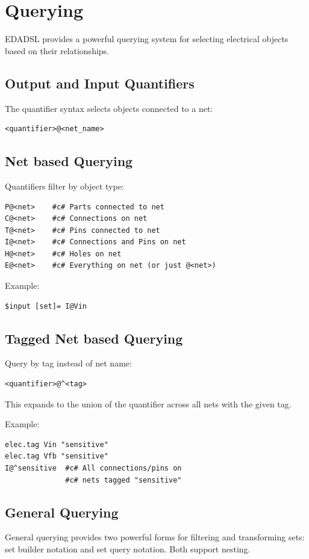 \documentclass{report}
\begin{document}
\chapter{Querying}
EDADSL provides a powerful querying system for selecting electrical objects based on their relationships.

\section{Output and Input Quantifiers}
The quantifier syntax selects objects connected to a net:
\begin{verbatim}
<quantifier>@<net_name>
\end{verbatim}

\section{Net based Querying}
Quantifiers filter by object type:
\begin{verbatim}
P@<net>    #c# Parts connected to net
C@<net>    #c# Connections on net
T@<net>    #c# Pins connected to net
I@<net>    #c# Connections and Pins on net
H@<net>    #c# Holes on net
E@<net>    #c# Everything on net (or just @<net>)
\end{verbatim}

Example:
\begin{verbatim}
$input [set]= I@Vin
\end{verbatim}

\section{Tagged Net based Querying}
Query by tag instead of net name:
\begin{verbatim}
<quantifier>@^<tag>
\end{verbatim}
This expands to the union of the quantifier across all nets with the given tag.

Example:
\begin{verbatim}
elec.tag Vin "sensitive"
elec.tag Vfb "sensitive"
I@^sensitive  #c# All connections/pins on 
              #c# nets tagged "sensitive"
\end{verbatim}

\section{General Querying}
\label{sec:general-querying}
General querying provides two powerful forms for filtering and transforming sets: set builder notation and set query notation. Both support nesting.
\end{document}
